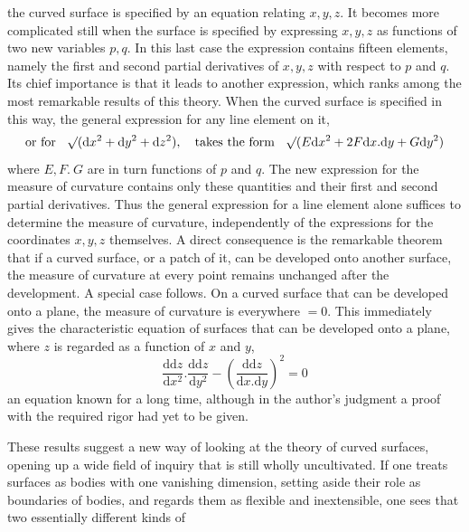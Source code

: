 %
the curved surface is specified by an equation relating \(x,y,z\). It becomes more complicated still when the surface is specified by expressing \(x,y,z\) as functions of two new variables \(p,q\). In this last case the expression contains fifteen elements, namely the first and second partial derivatives of \(x,y,z\) with respect to \(p\) and \(q\). Its chief importance is that it leads to another expression, which ranks among the most remarkable results of this theory. When the curved surface is specified in this way, the general expression for any line element on it,
\[
\text{or for}\quad\mathord{{}^{}\!\surd}(\mathrm{d}x^2+\mathrm{d}y^2+\mathrm{d}z^2),\quad\text{takes the form}\quad\mathord{{}^{}\!\surd}(E\mathrm{d}x^2+2F\mathrm{d}x\mathord{.}\mathrm{d}y+G\mathrm{d}y^2)
\]
where \(E,F.\ G\) are in turn functions of \(p\) and \(q\). The new expression for the measure of curvature contains only these quantities and their first and second partial derivatives. Thus the general expression for a line element alone suffices to determine the measure of curvature, independently of the expressions for the coordinates \(x,y,z\) themselves. A direct consequence is the remarkable theorem that if a curved surface, or a patch of it, can be developed onto another surface, the measure of curvature at every point remains unchanged after the development. A special case follows. On a curved surface that can be developed onto a plane, the measure of curvature is everywhere \(=0\). This immediately gives the characteristic equation of surfaces that can be developed onto a plane, where \(z\) is regarded as a function of \(x\) and \(y\),
\[
\frac{\mathrm{dd}z}{\mathrm{d}x^2}\mathord{.}\frac{\mathrm{dd}z}{\mathrm{d}y^2}-(\frac{\mathrm{dd}z}{\mathrm{d}x\mathord{.}\mathrm{d}y})^2=0
\]
an equation known for a long time, although in the author's judgment a proof with the required rigor had yet to be given.

These results suggest a new way of looking at the theory of curved surfaces, opening up a wide field of inquiry that is still wholly uncultivated. If one treats surfaces as bodies with one vanishing dimension, setting aside their role as boundaries of bodies, and regards them as flexible and inextensible, one sees that two essentially different kinds of
